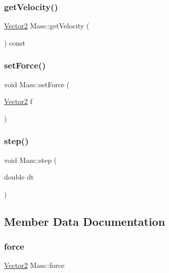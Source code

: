 \subsubsection{\texorpdfstring{get\+Velocity()}{getVelocity()}}
{\footnotesize\ttfamily \hyperlink{classVector2}{Vector2} Mass\+::get\+Velocity (\begin{DoxyParamCaption}{ }\end{DoxyParamCaption}) const}

\mbox{\label{classMass_a0e1280cef830d9d160577fe3d46ac6f5}} 
\subsubsection{\texorpdfstring{set\+Force()}{setForce()}}
{\footnotesize\ttfamily void Mass\+::set\+Force (\begin{DoxyParamCaption}\item[{\hyperlink{classVector2}{Vector2}}]{f }\end{DoxyParamCaption})}

\mbox{\label{classMass_af603ce820dd8afd520a98d8ac4f00933}} 
\subsubsection{\texorpdfstring{step()}{step()}}
{\footnotesize\ttfamily void Mass\+::step (\begin{DoxyParamCaption}\item[{double}]{dt }\end{DoxyParamCaption})}



\subsection{Member Data Documentation}
\mbox{\label{classMass_a0e78a40a61856046fe535f49c66ba04c}} 
\subsubsection{\texorpdfstring{force}{force}}
{\footnotesize\ttfamily \hyperlink{classVector2}{Vector2} Mass\+::force\hspace{0.3cm}{\ttfamily [protected]}}

